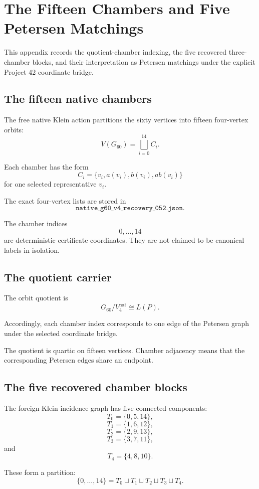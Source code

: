 \section{The Fifteen Chambers and Five Petersen Matchings}

This appendix records the quotient-chamber indexing, the five recovered
three-chamber blocks, and their interpretation as Petersen matchings
under the explicit Project 42 coordinate bridge.

\subsection{The fifteen native chambers}

The free native Klein action partitions the sixty vertices into
fifteen four-vertex orbits:
\[
V(G_{60})
=
\bigsqcup_{i=0}^{14} C_i.
\]

Each chamber has the form
\[
C_i
=
\{v_i,a(v_i),b(v_i),ab(v_i)\}
\]
for one selected representative \(v_i\).

The exact four-vertex lists are stored in
\[
\texttt{native\_g60\_v4\_recovery\_052.json}.
\]

The chamber indices
\[
0,\ldots,14
\]
are deterministic certificate coordinates. They are not claimed to be
canonical labels in isolation.

\subsection{The quotient carrier}

The orbit quotient is
\[
G_{60}/V_4^{\mathrm{nat}}
\cong
L(P).
\]

Accordingly, each chamber index corresponds to one edge of the
Petersen graph under the selected coordinate bridge.

The quotient is quartic on fifteen vertices. Chamber adjacency means
that the corresponding Petersen edges share an endpoint.

\subsection{The five recovered chamber blocks}

The foreign-Klein incidence graph has five connected components:
\[
T_0=\{0,5,14\},
\]
\[
T_1=\{1,6,12\},
\]
\[
T_2=\{2,9,13\},
\]
\[
T_3=\{3,7,11\},
\]
and
\[
T_4=\{4,8,10\}.
\]

These form a partition:
\[
\{0,\ldots,14\}
=
T_0\sqcup T_1\sqcup T_2\sqcup T_3\sqcup T_4.
\]

